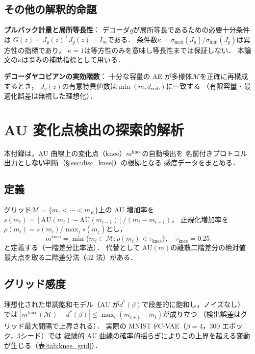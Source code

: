 \documentclass[11pt,a4paper]{jsarticle}
\newcommand{\Jg}{J_g}
\newcommand{\kap}{\kappa}
\newcommand{\demb}{d_{\mathrm{emb}}}
\newcommand{\mknee}{m^{\mathrm{knee}}}
\newcommand{\dstar}{d^{*}(\beta)}
\begin{document}
\subsection{その他の解釈的命題}

\textbf{プルバック計量と局所等長性}：
デコーダ$g$が局所等長であるための必要十分条件は
$G(z) = \Jg(z)^\top \Jg(z) = I_m$である．
条件数$\kap = \sigma_{\max}(\Jg)/\sigma_{\min}(\Jg)$は異方性の指標であり，
$\kap = 1$は等方性のみを意味し等長性までは保証しない．
本論文の$\kap$は歪みの補助指標として用いる．

\textbf{デコーダヤコビアンの実効階数}：
十分な容量の AE が多様体$\mathcal{M}$を正確に再構成するとき，
$\Jg(z)$の有意特異値数は$\min(m, \demb)$に一致する
（有限容量・最適化誤差は無視した理想化）．

\section{AU 変化点検出の探索的解析}\label{app:knee}

本付録は，AU 曲線上の変化点（knee）$\mknee$の自動検出を
名前付きプロトコル出力とし\textbf{ない}判断（§\ref{sec:disc_knee}）の根拠となる
感度データをまとめる．

\subsection{定義}

グリッド$\mathcal{M} = \{m_1 < \cdots < m_K\}$上の AU 増加率を
$s(m_i) = [\mathrm{AU}(m_i) - \mathrm{AU}(m_{i-1})] / (m_i - m_{i-1})$，
正規化増加率を$\rho(m_i) = s(m_i) / \max_j s(m_j)$とし，
\begin{equation}
  \mknee = \min\{m_i \in \mathcal{M} : \rho(m_i) < \tau_{\mathrm{knee}}\},
  \quad \tau_{\mathrm{knee}} = 0.25
  \label{eq:mknee}
\end{equation}
と定義する（一階差分比率法）．
代替として AU$(m)$の離散二階差分の絶対値最大点を取る二階差分法（d2 法）がある．

\subsection{グリッド感度}

理想化された単調飽和モデル（AU が$\dstar$で段差的に飽和し，ノイズなし）では
$|\mknee(\mathcal{M}) - \dstar| \leq \max_i (m_{i+1} - m_i)$が成り立つ
（検出誤差はグリッド最大間隔で上界される）．
実際の MNIST FC-VAE（$\beta = 4$，300 エポック，3シード）では
経験的 AU 曲線の確率的揺らぎによりこの上界を超える変動が生じる（表\ref{tab:knee_grid}）．
\end{document}
